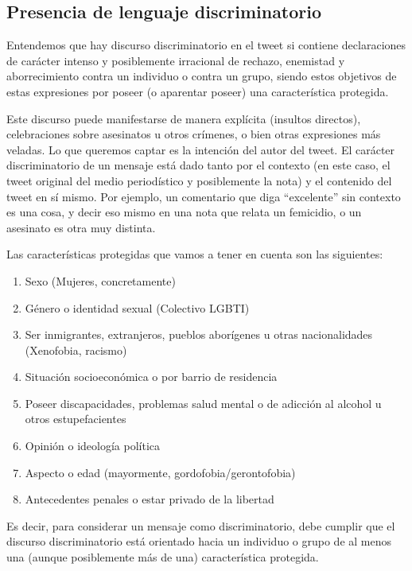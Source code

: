 
\subsection{Presencia de lenguaje discriminatorio}

Entendemos que hay discurso discriminatorio en el tweet si contiene declaraciones de carácter intenso y posiblemente irracional de rechazo, enemistad y aborrecimiento contra un individuo o contra un grupo, siendo estos objetivos de estas expresiones por poseer (o aparentar poseer) una característica protegida.

Este discurso puede manifestarse de manera explícita (insultos directos), celebraciones sobre asesinatos u otros crímenes, o bien otras expresiones más veladas. Lo que queremos captar es la intención del autor del tweet. El carácter discriminatorio de un mensaje está dado tanto por el contexto (en este caso, el tweet original del medio periodístico y posiblemente la nota) y el contenido del tweet en sí mismo. Por ejemplo, un comentario que diga ``excelente'' sin contexto es una cosa, y decir eso mismo en una nota que relata un femicidio, o un asesinato es otra muy distinta.

Las características protegidas que vamos a tener en cuenta son las siguientes:

\begin{enumerate}
\item Sexo (Mujeres, concretamente)
\item Género o identidad sexual (Colectivo LGBTI)
\item Ser inmigrantes, extranjeros, pueblos aborígenes u otras nacionalidades (Xenofobia, racismo)
\item Situación socioeconómica o por barrio de residencia
\item Poseer discapacidades, problemas salud mental o de adicción al alcohol u otros estupefacientes
\item Opinión o ideología política
\item Aspecto o edad (mayormente, gordofobia/gerontofobia)
\item Antecedentes penales o estar privado de la libertad

\end{enumerate}

Es decir, para considerar un mensaje como discriminatorio, debe cumplir que el discurso discriminatorio está orientado hacia un individuo o grupo de al menos una (aunque posiblemente más de una) característica protegida.


